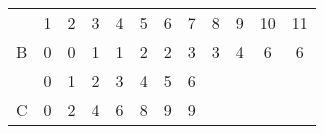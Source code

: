 \documentclass{standalone}
\begin{document}
\begin{tabular}{c|c|c|c|c|c|c|c|c|c|c|c|}
\multicolumn{1}{c}{}&
\multicolumn{1}{c}{1}&
\multicolumn{1}{c}{2}&
\multicolumn{1}{c}{3}&
\multicolumn{1}{c}{4}&
\multicolumn{1}{c}{5}&
\multicolumn{1}{c}{6}&
\multicolumn{1}{c}{7}&
\multicolumn{1}{c}{8}&
\multicolumn{1}{c}{9}&
\multicolumn{1}{c}{10}&
\multicolumn{1}{c}{11}\\
B&
\cellcolor{lightgray}0&
\cellcolor{lightgray}0&
\cellcolor{lightgray}1&
\cellcolor{lightgray}1&
\cellcolor{lightgray}2&
\cellcolor{lightgray}2&
\cellcolor{lightgray}3&
\cellcolor{lightgray}3&
\cellcolor{lightgray}4&
\cellcolor{lightgray}6&
\cellcolor{lightgray}6\\
\multicolumn{1}{c}{}&
\multicolumn{1}{c}{0}&
\multicolumn{1}{c}{1}&
\multicolumn{1}{c}{2}&
\multicolumn{1}{c}{3}&
\multicolumn{1}{c}{4}&
\multicolumn{1}{c}{5}&
\multicolumn{1}{c}{6}\\
C&
\cellcolor{lightgray}0&
\cellcolor{lightgray}2&
\cellcolor{lightgray}4&
\cellcolor{lightgray}6&
\cellcolor{lightgray}8&
\cellcolor{lightgray}9&
\cellcolor{lightgray}9
\end{tabular}
\end{document}
